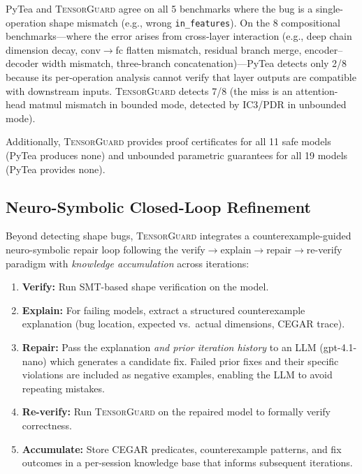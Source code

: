 \documentclass[11pt]{article}
\begin{document}
PyTea and \textsc{TensorGuard} agree on all 5 benchmarks where
the bug is a single-operation shape mismatch (e.g., wrong
\texttt{in\_features}).  On the 8 compositional benchmarks---where
the error arises from cross-layer interaction (e.g., deep chain
dimension decay, conv$\to$fc flatten mismatch, residual branch
merge, encoder--decoder width mismatch, three-branch
concatenation)---PyTea detects only 2/8 because its per-operation
analysis cannot verify that layer outputs are compatible with
downstream inputs.  \textsc{TensorGuard} detects 7/8 (the miss
is an attention-head matmul mismatch in bounded mode, detected
by IC3/PDR in unbounded mode).

Additionally, \textsc{TensorGuard} provides proof certificates
for all 11 safe models (PyTea produces none) and unbounded
parametric guarantees for all 19 models (PyTea provides none).


\subsection{Neuro-Symbolic Closed-Loop Refinement}\label{sec:neurosym}

Beyond detecting shape bugs, \textsc{TensorGuard} integrates a
counterexample-guided neuro-symbolic repair loop following the
verify$\to$explain$\to$repair$\to$re-verify paradigm with
\emph{knowledge accumulation} across iterations:
\begin{enumerate}[leftmargin=2em]
  \item \textbf{Verify:} Run SMT-based shape verification on the model.
  \item \textbf{Explain:} For failing models, extract a structured
    counterexample explanation (bug location, expected vs.\ actual
    dimensions, CEGAR trace).
  \item \textbf{Repair:} Pass the explanation \emph{and prior
    iteration history} to an LLM (gpt-4.1-nano) which generates
    a candidate fix.  Failed prior fixes and their specific
    violations are included as negative examples, enabling the
    LLM to avoid repeating mistakes.
  \item \textbf{Re-verify:} Run \textsc{TensorGuard} on the repaired
    model to formally verify correctness.
  \item \textbf{Accumulate:} Store CEGAR predicates, counterexample
    patterns, and fix outcomes in a per-session knowledge base
    that informs subsequent iterations.
\end{enumerate}
\end{document}

